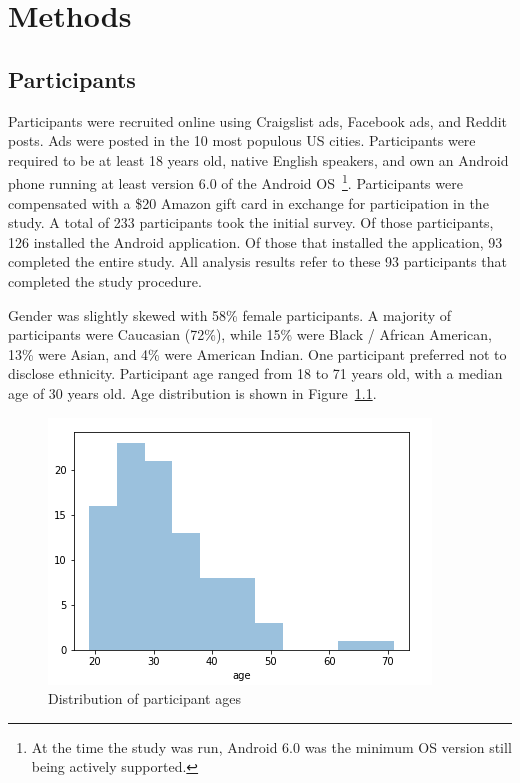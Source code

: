 \documentclass[12pt]{nuthesis}	%
\begin{document}
\chapter{Methods}

\section{Participants}

Participants were recruited online using Craigslist ads, Facebook ads, and Reddit posts. Ads were posted in the 10 most populous US cities. Participants were required to be at least 18 years old, native English speakers, and own an Android phone running at least version 6.0 of the Android OS~\footnote{At the time the study was run, Android 6.0 was the minimum OS version still being actively supported.}. Participants were compensated with a \$20 Amazon gift card in exchange for participation in the study. A total of 233 participants took the initial survey. Of those participants, 126 installed the Android application. Of those that installed the application, 93 completed the entire study. All analysis results refer to these 93 participants that completed the study procedure.

Gender was slightly skewed with 58\% female participants. A majority of participants were Caucasian (72\%), while 15\% were Black / African American, 13\% were Asian, and 4\% were American Indian. One participant preferred not to disclose ethnicity. Participant age ranged from 18 to 71 years old, with a median age of 30 years old. Age distribution is shown in Figure~\ref{fig:age}.

\begin{figure}[h]
\centering
\includegraphics[width=.7\textwidth]{figures/age_distribution}
\caption{Distribution of participant ages}
\label{fig:age}
\end{figure}
\end{document}
